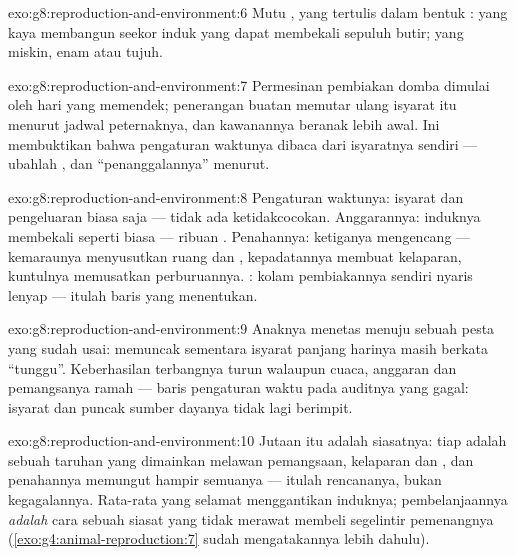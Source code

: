 \begin{solution}{exo:g8:reproduction-and-environment:6}
Mutu , yang tertulis dalam bentuk :   yang
kaya membangun seekor induk yang dapat membekali sepuluh butir; yang
miskin, enam atau tujuh.
\end{solution}

\begin{solution}{exo:g8:reproduction-and-environment:7}
Permesinan pembiakan domba  dimulai oleh hari yang memendek;
penerangan buatan memutar ulang isyarat itu menurut jadwal
peternaknya, dan kawanannya beranak lebih awal. Ini membuktikan bahwa
pengaturan waktunya dibaca dari isyaratnya sendiri --- ubahlah
, dan ``penanggalannya'' menurut.
\end{solution}

\begin{solution}{exo:g8:reproduction-and-environment:8}
Pengaturan waktunya: isyarat dan pengeluaran  biasa saja ---
tidak ada ketidakcocokan. Anggarannya: induknya membekali seperti
biasa --- ribuan . Penahannya: ketiganya mengencang ---
kemaraunya menyusutkan ruang dan , kepadatannya membuat
kelaparan, kuntulnya memusatkan perburuannya. : kolam
pembiakannya sendiri nyaris lenyap --- itulah baris yang menentukan.
\end{solution}

\begin{solution}{exo:g8:reproduction-and-environment:9}
Anaknya menetas menuju sebuah pesta yang sudah usai:  memuncak
sementara isyarat panjang harinya masih berkata ``tunggu''.
Keberhasilan terbangnya turun walaupun cuaca, anggaran dan pemangsanya
ramah --- baris pengaturan waktu pada auditnya yang gagal: isyarat dan
puncak sumber dayanya tidak lagi berimpit.
\end{solution}

\begin{solution}{exo:g8:reproduction-and-environment:10}
Jutaan itu adalah siasatnya: tiap  adalah sebuah taruhan yang
dimainkan melawan pemangsaan, kelaparan dan , dan penahannya
memungut hampir semuanya --- itulah rencananya, bukan kegagalannya.
Rata-rata yang selamat menggantikan induknya; pembelanjaannya
\emph{adalah} cara sebuah siasat yang tidak merawat membeli segelintir
pemenangnya (\cref{exo:g4:animal-reproduction:7} sudah mengatakannya
lebih dahulu).
\end{solution}

